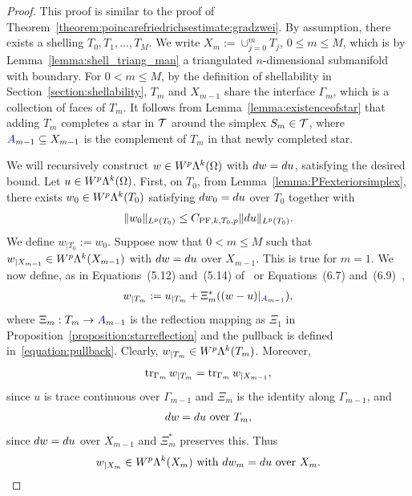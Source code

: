 \documentclass[10pt,letterpaper]{article}
\begin{document}
\begin{proof}
    This proof is similar to the proof of Theorem~\ref{theorem:poincarefriedrichsestimate:gradzwei}.
    By assumption, there exists a shelling $T_0, T_1, \dots, T_{M}$. 
    We write $X_m := \cup_{j=0}^{m} T_j$, $0 \leq m \leq M$, which is by Lemma~\ref{lemma:shell_triang_man} a triangulated $n$-dimensional submanifold with boundary. 
    For $0 < m \leq M$, by the definition of shellability in Section~\ref{section:shellability}, 
    $T_{m}$ and $X_{m-1}$ share the interface $\Gamma_{m}$, which is a collection of faces of $T_{m}$. 
    It follows from Lemma~\ref{lemma:existenceofstar} that adding $T_{m}$ completes a star in ${\mathcal T}$ around the simplex $S_{m} \in {\mathcal T}$, 
    where ${\color{blue}A}_{m-1} \subseteq X_{m-1}$ is the complement of $T_{m}$ in that newly completed star. 
    
    We will recursively construct $w \in W^{p}\Lambda^{k}(\Omega)$ with $d w = d u$, satisfying the desired bound. 
    Let $u \in W^{p}\Lambda^{k}(\Omega)$. 
    First, on $T_0$, from Lemma~\ref{lemma:PFexteriorsimplex}, 
    there exists $w_0 \in W^{p}\Lambda^{k}(T_{0})$ satisfying $d w_0 = d u$ over $T_{0}$ together with 
    \begin{gather*}
        \| w_0 \|_{L^{p}(T_{0})} \leq C_{{\rm{PF}},k,T_{0},p} \| d u \|_{L^{p}(T_{0})}.
    \end{gather*}
    We define $w_{|T_0} := w_0$. 
    Suppose now that $0 < m \leq M$ such that $w_{|X_{m-1}} \in W^{p}\Lambda^{k}(X_{m-1})$ with $d w = d u$ over $X_{m-1}$. 
    This is true for $m = 1$. 
    We now define, as in Equations~(5.12) and~(5.14) of~\cite{ern2020stable} or Equations~(6.7) and~(6.9)~\cite{Chaum_Voh_p_rob_3D_H_curl_24},
    \begin{align} \label{equation:w''_ext_der}
        w_{|T_m} := u_{|T_m} + \Xi_{m}^{\ast}((w - u)|_{{\color{blue}A}_{m-1}}),
    \end{align}
    where $\Xi_{m} : T_{m} \rightarrow {\color{blue}A}_{m-1}$ is the reflection mapping
    as $\Xi_{1}$ in Proposition~\ref{proposition:starreflection} and the pullback is defined in~\eqref{equation:pullback}.
    Clearly, $w_{|T_m} \in W^{p}\Lambda^{k}(T_{m})$. Moreover,
    \begin{align*}
        \operatorname{tr}_{\Gamma_{m}} w_{|T_m} = \operatorname{tr}_{\Gamma_{m}} w_{|X_{m-1}},
    \end{align*}
    since $u$ is trace continuous over $\Gamma_{m-1}$ and $\Xi_{m}$ is the identity along $\Gamma_{m-1}$, and
    \begin{align*}
        d w = d u \text{ over } T_m,
    \end{align*}
    since $d w = d u$ over $X_{m-1}$ and $\Xi_{m}^{\ast}$ preserves this. Thus
    \begin{align*}
        w_{|X_{m}} \in W^{p}\Lambda^{k}(X_{m}) \text{ with } d w_{m} = d u \text{ over } X_{m}. 
    \end{align*}
    

\end{proof}
\end{document}
